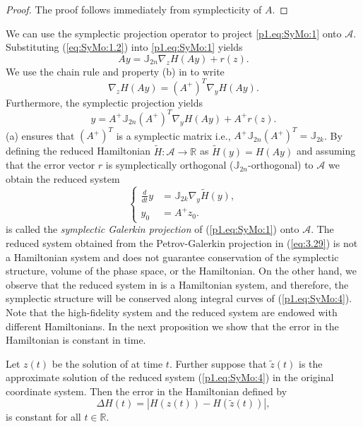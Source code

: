 \begin{proof}
The proof follows immediately from symplecticity of $A$.
\end{proof}
We can use the symplectic projection operator to project \cref{p1.eq:SyMo:1} onto $\mathcal A$. Substituting (\ref{eq:SyMo:1.2}) into \cref{p1.eq:SyMo:1} yields
\begin{equation} \label{p1.eq:SyMo:2}
	A y = \mathbb{J}_{2n} \nabla_{z} H(A y) + r(z). 
\end{equation}
We use the chain rule and property (b) in  to write 
\begin{equation}
	\nabla_{z} H(A y) = (A^+)^T \nabla_{y} H( Ay ).
\end{equation}
Furthermore, the symplectic projection yields
\begin{equation} \label{p1.eq:SyMo:3}
	y = A^+ \mathbb J_{2n} (A^+)^T \nabla_{y} H(A y) + A^+ r(z).
\end{equation}
 (a) ensures that $(A^+)^T$ is a symplectic matrix i.e., $A^+ \mathbb J_{2n} (A^+)^T = \mathbb{J}_{2k}$. By defining the reduced Hamiltonian $\tilde H:\mathcal A \to \mathbb R$ as $\tilde H (y) = H(Ay)$ and assuming that the error vector $r$ is symplectically orthogonal ($\mathbb J_{2n}$-orthogonal) to $\mathcal A$ we obtain the reduced system
\begin{equation} \label{p1.eq:SyMo:4}
\left\{
\begin{aligned}
	 \frac{d}{dt} y &= \mathbb J_{2k} \nabla_{y} \tilde H(y), \\
	 y_0 &= A^+ z_0.
\end{aligned}
\right.
\end{equation}
 is called the \emph{symplectic Galerkin projection} of (\ref{p1.eq:SyMo:1}) onto $\mathcal A$. The reduced system obtained from the Petrov-Galerkin projection in (\ref{eq:3.29}) is not a Hamiltonian system and does not guarantee conservation of the symplectic structure, volume of the phase space, or the Hamiltonian. On the other hand, we observe that the reduced system in  is a Hamiltonian system, and therefore, the symplectic structure will be conserved along integral curves of (\ref{p1.eq:SyMo:4}). Note that the high-fidelity system and the reduced system are endowed with different Hamiltonians. In the next proposition we show that the error in the Hamiltonian is constant in time. 


\begin{proposition} \label{p1.theorem:2}
Let ${z} (t)$ be the solution of  at time $t$. Further suppose that $\tilde{{z}} (t)$ is the approximate solution of the reduced system (\ref{p1.eq:SyMo:4}) in the original coordinate system. Then the error in the Hamiltonian defined by
\begin{equation} \label{p1.eq:SyMo:5}
	\Delta H(t)  = |H(z(t)) - H(\tilde{z}(t))|,
\end{equation}
is constant for all $t\in \mathbb R$.
\end{proposition}

